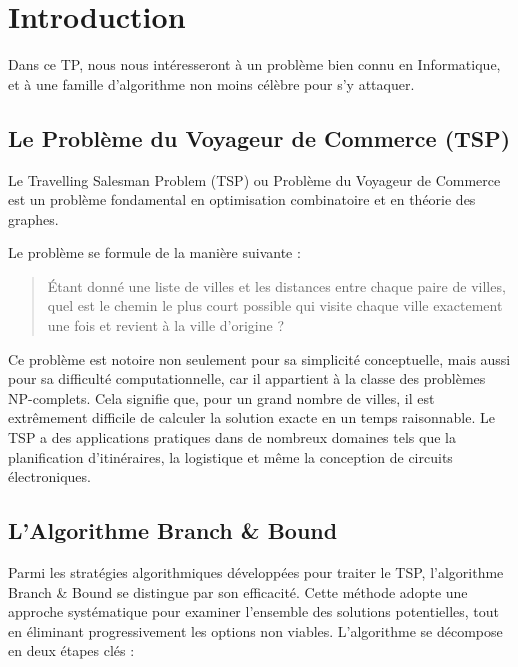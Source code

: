 
\section{Introduction}\label{introduction}

Dans ce TP, nous nous intéresseront à un problème bien connu en Informatique, et à une famille d'algorithme non moins célèbre pour s'y attaquer.

\subsection{Le Problème du Voyageur de Commerce
(TSP)}\label{le-probluxe8me-du-voyageur-de-commerce-tsp}

Le Travelling Salesman Problem (TSP) ou Problème du Voyageur de Commerce est un problème fondamental en optimisation combinatoire et en théorie des graphes.

Le problème se formule de la manière suivante :

\begin{quote}
Étant donné une liste de villes et les distances entre chaque paire de villes, quel est le chemin le plus court possible qui visite chaque ville exactement une fois et revient à la ville d'origine ?
\end{quote}

Ce problème est notoire non seulement pour sa simplicité conceptuelle, mais aussi pour sa difficulté computationnelle, car il appartient à la classe des problèmes NP-complets. Cela signifie que, pour un grand nombre de villes, il est extrêmement difficile de calculer la solution exacte en un temps raisonnable. Le TSP a des applications pratiques dans de nombreux domaines tels que la planification d'itinéraires, la logistique et même la conception de circuits électroniques.

\subsection{L'Algorithme Branch \&
Bound}\label{lalgorithme-branch-bound}

Parmi les stratégies algorithmiques développées pour traiter le TSP, l'algorithme Branch \& Bound se distingue par son efficacité. Cette méthode adopte une approche systématique pour examiner l'ensemble des solutions potentielles, tout en éliminant progressivement les options non viables. L'algorithme se décompose en deux étapes clés :

